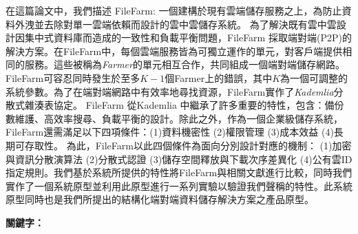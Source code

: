 \begin{abstractzh}
  在這篇論文中，我們描述 FileFarm: 一個建構於現有雲端儲存服務之上，為防止資料外洩並去除對單一雲端依賴而設計的雲中雲儲存系統。 為了解決既有雲中雲設計因集中式資料庫而造成的一致性和負載平衡問題，FileFarm 採取端對端(P2P)的解決方案。在FileFarm中，每個雲端服務皆為可獨立運作的單元，對客戶端提供相同的服務。這些被稱為\textit{Farmer}的單元相互合作，共同組成一個端對端儲存網路。FileFarm可容忍同時發生於至多$K-1$個Farmer上的錯誤，其中$K$為一個可調整的系統參數。為了在端對端網路中有效率地尋找資源，FileFarm實作了\textit{Kademlia}分散式雜湊表協定\cite{maymounkov2002kademlia}。 FileFarm 從Kademlia 中繼承了許多重要的特性，包含：備份數維護、高效率搜尋、負載平衡的設計。除此之外，作為一個企業級儲存系統，FileFarm還需滿足以下四項條件：(1)資料機密性 (2)權限管理 (3)成本效益 (4)長期可存取性。 為此，FileFarm以此四個條件為面向分別設計對應的機制： (1)加密與資訊分散演算法 (2)分散式認證 (3)儲存空間釋放與下載次序差異化 (4)公有雲ID指定規則。我們基於系統所提供的特性將FileFarm與相關文獻進行比較，同時我們實作了一個系統原型並利用此原型進行一系列實驗以驗證我們聲稱的特性。此系統原型同時也是我們所提出的結構化端對端資料儲存解決方案之產品原型。

\bigbreak
\noindent \textbf{關鍵字：}{\, \makeatletter \@keywordszh \makeatother}
\end{abstractzh}


